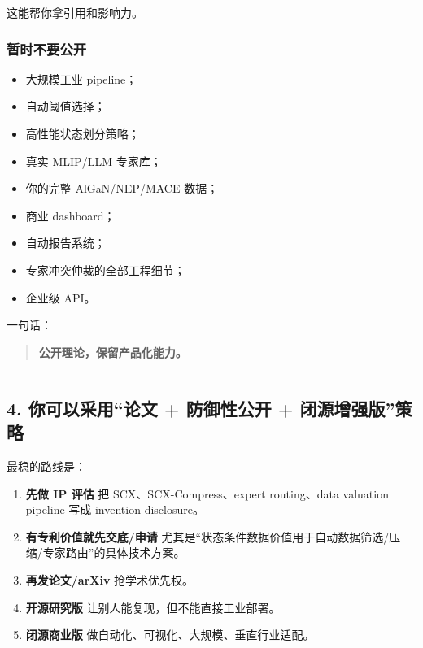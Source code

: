 \documentclass[
  12pt,
]{ctexart}
\providecommand{\tightlist}{%
  \setlength{\itemsep}{0pt}\setlength{\parskip}{0pt}}
\begin{document}
这能帮你拿引用和影响力。

\subsubsection{暂时不要公开}\label{ux6682ux65f6ux4e0dux8981ux516cux5f00}

\begin{itemize}
\tightlist
\item
  大规模工业 pipeline；
\item
  自动阈值选择；
\item
  高性能状态划分策略；
\item
  真实 MLIP/LLM 专家库；
\item
  你的完整 AlGaN/NEP/MACE 数据；
\item
  商业 dashboard；
\item
  自动报告系统；
\item
  专家冲突仲裁的全部工程细节；
\item
  企业级 API。
\end{itemize}

一句话：

\begin{quote}
\textbf{公开理论，保留产品化能力。}
\end{quote}

\begin{center}\rule{0.5\linewidth}{0.5pt}\end{center}

\subsection{4. 你可以采用``论文 + 防御性公开 +
闭源增强版''策略}\label{ux4f60ux53efux4ee5ux91c7ux7528ux8bbaux6587-ux9632ux5fa1ux6027ux516cux5f00-ux95edux6e90ux589eux5f3aux7248ux7b56ux7565}

最稳的路线是：

\begin{enumerate}
\def\labelenumi{\arabic{enumi}.}
\item
  \textbf{先做 IP 评估} 把 SCX、SCX-Compress、expert routing、data
  valuation pipeline 写成 invention disclosure。
\item
  \textbf{有专利价值就先交底/申请}
  尤其是``状态条件数据价值用于自动数据筛选/压缩/专家路由''的具体技术方案。
\item
  \textbf{再发论文/arXiv} 抢学术优先权。
\item
  \textbf{开源研究版} 让别人能复现，但不能直接工业部署。
\item
  \textbf{闭源商业版} 做自动化、可视化、大规模、垂直行业适配。
\end{enumerate}
\end{document}
